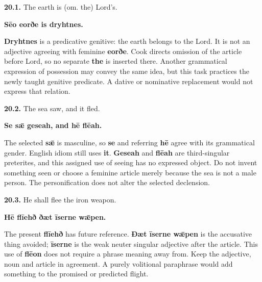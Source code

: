 \par\begin{minipage}{\linewidth}\raggedright
\textbf{20.1.} The earth is (om. the) Lord’s.

\textbf{Sēo eorðe is dryhtnes.}

\textbf{Dryhtnes} is a predicative genitive: the earth belongs to the Lord. It is not an adjective agreeing with feminine \textbf{eorðe}. Cook directs omission of the article before Lord, so no separate \textbf{the} is inserted there. Another grammatical expression of possession may convey the same idea, but this task practices the newly taught genitive predicate. A dative or nominative replacement would not express that relation.

\end{minipage}\par\addvspace{4pt}

\par\begin{minipage}{\linewidth}\raggedright
\textbf{20.2.} The sea saw, and it fled.

\textbf{Se sǣ geseah, and hē flēah.}

The selected \textbf{sǣ} is masculine, so \textbf{se} and referring \textbf{hē} agree with its grammatical gender. English idiom still uses \textbf{it}. \textbf{Geseah} and \textbf{flēah} are third-singular preterites, and this assigned use of seeing has no expressed object. Do not invent something seen or choose a feminine article merely because the sea is not a male person. The personification does not alter the selected declension.

\end{minipage}\par\addvspace{4pt}

\par\begin{minipage}{\linewidth}\raggedright
\textbf{20.3.} He shall flee the iron weapon.

\textbf{Hē flīehð ðæt īserne wǣpen.}

The present \textbf{flīehð} has future reference. \textbf{Ðæt īserne wǣpen} is the accusative thing avoided; \textbf{īserne} is the weak neuter singular adjective after the article. This use of \textbf{flēon} does not require a phrase meaning away from. Keep the adjective, noun and article in agreement. A purely volitional paraphrase would add something to the promised or predicted flight.

\end{minipage}\par\addvspace{4pt}


